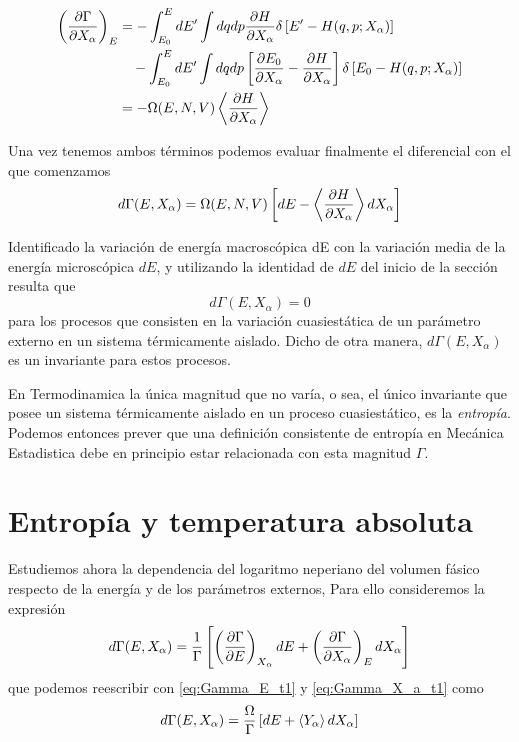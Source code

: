 \begin{align} \label{eq:Gamma_X_a_t1}
	\left( \pdv{\Gamma}{X_\alpha} \right)_{E} &= - \int^E_{E_0} dE' \int dq dp \pdv{H}{X_\alpha} \delta \left[ E' - H(q,p;X_\alpha) \right]  \nonumber \\ 
	&\quad - \int^E_{E_0} dE' \int dq dp \left[ \pdv{E_0}{X_\alpha} - \pdv{H}{X_\alpha} \right] \delta \left[ E_0 - H(q,p;X_\alpha) \right] \\
	&= -\Omega(E,N,V) \expval{\pdv{H}{X_\alpha}} \nonumber
\end{align}

Una vez tenemos ambos términos podemos evaluar finalmente el diferencial con el que comenzamos
\begin{equation}
	d\Gamma(E,X_\alpha) = \Omega(E,N,V)\left[dE - \expval{\pdv{H}{X_\alpha}} dX_\alpha \right]
\end{equation}

Identificado la variación de energía macroscópica dE con la variación media de la energía microscópica $dE$, y utilizando la identidad de $dE$ del inicio de la sección resulta que $$d\Gamma(E,X_\alpha) = 0$$ para los procesos que consisten en la variación cuasiestática de un parámetro externo en un sistema térmicamente aislado. Dicho de otra manera, $d\Gamma(E,X_\alpha)$ es un invariante para estos procesos.

En Termodinamica la única magnitud que no varía, o sea, el único invariante que posee un sistema térmicamente aislado en un proceso cuasiestático, es la \emph{entropía}. Podemos entonces prever que una definición consistente de entropía en Mecánica Estadistica debe en principio estar relacionada con esta magnitud $\Gamma$.

\section{Entropía y temperatura absoluta}

Estudiemos ahora la dependencia del logaritmo neperiano del volumen fásico respecto de la energía y de los parámetros externos, Para ello consideremos la expresión
\begin{equation}
	d\Gamma(E,X_\alpha) = \frac{1}{\Gamma} \left[ \left( \pdv{\Gamma}{E} \right)_{X_\alpha} dE + \left( \pdv{\Gamma}{X_\alpha} \right)_{E} dX_\alpha\right]
\end{equation}
que podemos reescribir con \eqref{eq:Gamma_E_t1} y \eqref{eq:Gamma_X_a_t1} como
\begin{equation}\label{eq:dgamma_t1}
	d\Gamma(E,X_\alpha) = \frac{\Omega}{\Gamma} \left[ dE + \expval{Y_\alpha} dX_\alpha\right]
\end{equation}

